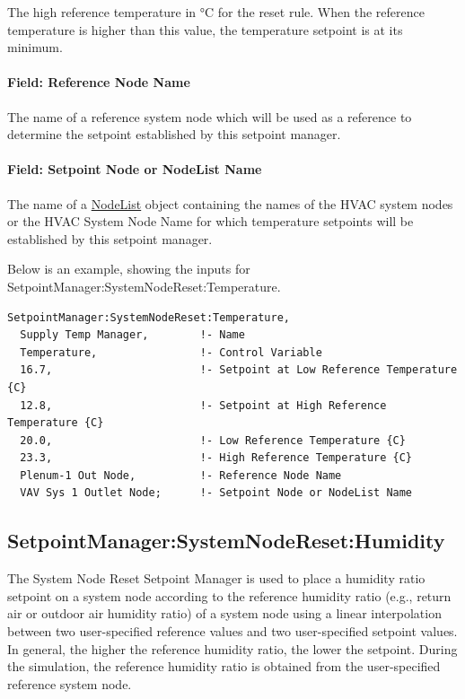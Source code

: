The high reference temperature in \si{\degreeCelsius} for the reset rule. When the reference temperature is higher than this value, the temperature setpoint is at its minimum.

\paragraph{Field: Reference Node Name}\label{field-reference-node-name-2}

The name of a reference system node which will be used as a reference to determine the setpoint established by this setpoint manager.

\paragraph{Field: Setpoint Node or NodeList Name}\label{field-setpoint-node-or-nodelist-name-22}

The name of a \hyperref[nodelist]{NodeList} object containing the names of the HVAC system nodes or the HVAC System Node Name for which temperature setpoints will be established by this setpoint manager.

Below is an example, showing the inputs for SetpointManager:SystemNodeReset:Temperature.

\begin{lstlisting}
SetpointManager:SystemNodeReset:Temperature,
  Supply Temp Manager,        !- Name
  Temperature,                !- Control Variable
  16.7,                       !- Setpoint at Low Reference Temperature {C}
  12.8,                       !- Setpoint at High Reference Temperature {C}
  20.0,                       !- Low Reference Temperature {C}
  23.3,                       !- High Reference Temperature {C}
  Plenum-1 Out Node,          !- Reference Node Name
  VAV Sys 1 Outlet Node;      !- Setpoint Node or NodeList Name
\end{lstlisting}

\subsection{SetpointManager:SystemNodeReset:Humidity}\label{setpointmanagersystemnoderesethumidity}

The System Node Reset Setpoint Manager is used to place a humidity ratio setpoint on a system node according to the reference humidity ratio (e.g., return air or outdoor air humidity ratio) of a system node using a linear interpolation between two user-specified reference values and two user-specified setpoint values. In general, the higher the reference humidity ratio, the lower the setpoint. During the simulation, the reference humidity ratio is obtained from the user-specified reference system node.

